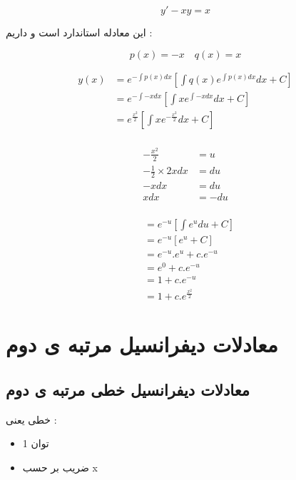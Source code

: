 \documentclass[12pt]{book}
\begin{document}
$$
y' - xy = x
$$

این معادله استاندارد است و داریم :

$$
p(x) = -x \quad q(x) = x
$$

\begin{align*}
y(x) &= e^{- \displaystyle\int{p(x)dx}} \left[ \int{q(x) e ^{ {\displaystyle\int{p(x)dx}}}dx } + C \right] \\
&= e^{- \displaystyle\int{ - x dx}} \left[ \int{ x  e ^{ {\displaystyle\int{ - x dx}}}dx } + C \right] \\
&= e^{\frac{x^{2}}{2}} \left[ \int{ x  e ^{- \frac{x^{2}}{2}} dx } + C \right] \\
\end{align*}


\begin{align*}
- \frac{x^{2}}{2} & = u \\
- \frac{1}{2} \times 2xdx &= du \\
- x dx &= du \\
xdx &= - du \\
\end{align*}


\begin{align*}
&= e^{- u} \left[ \int{e^{u}du} + C \right] \\
&= e^{-u} \left[ e^{u} + C \right] \\
&= e^{-u} . e^{u} + c . e^{-u} \\
&= e^{0} +  c . e^{-u} \\
&= 1 +  c . e^{-u} \\
&= 1 +  c . e^{\frac{x^{2}}{2}}
\end{align*}

\chapter{معادلات دیفرانسیل مرتبه ی دوم}


\section{معادلات دیفرانسیل خطی مرتبه ی دوم}

\begin{tcolorbox}
خطی یعنی :
\begin{itemize}
	\item توان 1
	\item ضریب بر حسب x
\end{itemize}
\end{tcolorbox}
\end{document}
